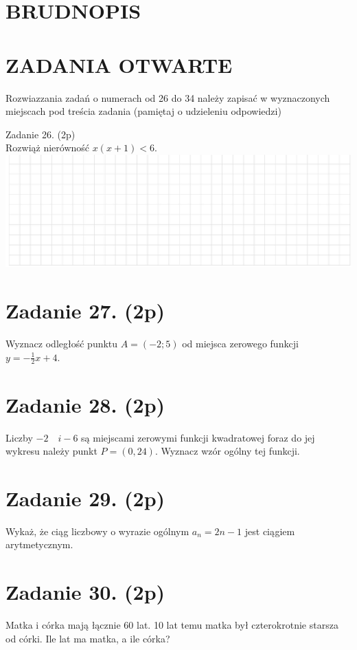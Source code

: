\documentclass[10pt]{article}
\begin{document}
\section*{BRUDNOPIS}
\section*{ZADANIA OTWARTE}
Rozwiazzania zadań o numerach od 26 do 34 należy zapisać w wyznaczonych miejscach pod treścia zadania (pamiętaj o udzieleniu odpowiedzi)

Zadanie 26. (2p)\\
Rozwiąż nierówność \(x(x+1)<6\).\\
\includegraphics[max width=\textwidth, center]{2024_11_21_eef8bdc8380ba249dbe1g-08}

\section*{Zadanie 27. (2p)}
Wyznacz odległość punktu \(A=(-2 ; 5)\) od miejsca zerowego funkcji \(y=-\frac{1}{2} x+4\).

\section*{Zadanie 28. (2p)}
Liczby \(-2 \quad i-6\) są miejscami zerowymi funkcji kwadratowej foraz do jej wykresu należy punkt \(P=(0,24)\). Wyznacz wzór ogólny tej funkcji.

\section*{Zadanie 29. (2p)}
Wykaż, że ciąg liczbowy o wyrazie ogólnym \(a_{n}=2 n-1\) jest ciągiem arytmetycznym.

\section*{Zadanie 30. (2p)}
Matka i córka mają łącznie 60 lat. 10 lat temu matka był czterokrotnie starsza od córki. Ile lat ma matka, a ile córka?
\end{document}

